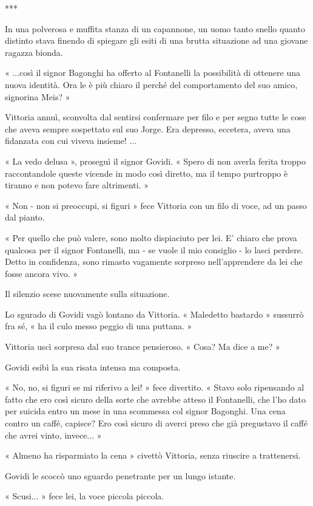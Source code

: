***

In una polverosa e muffita stanza di un capannone, un uomo tanto snello quanto distinto stava finendo di spiegare gli esiti di una brutta situazione ad una giovane ragazza bionda.

« ...così il signor Bagonghi ha offerto al Fontanelli la possibilità di ottenere una nuova identità. Ora le è più chiaro il perché del comportamento del suo amico, signorina Meis? »

Vittoria annuì, sconvolta dal sentirsi confermare per filo e per segno tutte le cose che aveva sempre sospettato sul suo Jorge. Era depresso, eccetera, aveva una fidanzata con cui viveva insieme! ...

« La vedo delusa », proseguì il signor Govidi. « Spero di non averla ferita troppo raccontandole queste vicende in modo così diretto, ma il tempo purtroppo è tiranno e non potevo fare altrimenti. »

« Non - non si preoccupi, si figuri » fece Vittoria con un filo di voce, ad un passo dal pianto.

« Per quello che può valere, sono molto dispiaciuto per lei. E' chiaro che prova qualcosa per il signor Fontanelli, ma - se vuole il mio consiglio - lo lasci perdere. Detto in confidenza, sono rimasto vagamente sorpreso nell'apprendere da lei che fosse ancora vivo. »

Il silenzio scese nuovamente sulla situazione.

Lo sgurado di Govidi vagò lontano da Vittoria. « Maledetto bastardo » sussurrò fra sé, « ha il culo messo peggio di una puttana. » 

Vittoria uscì sorpresa dal suo trance pensieroso. « Cosa? Ma dice a me?  »

Govidi esibì la sua risata intensa ma composta. 

« No, no, si figuri se mi riferivo a lei! » fece divertito.  « Stavo solo ripensando al fatto che ero così sicuro della sorte che avrebbe atteso il Fontanelli, che l'ho dato per suicida entro un mese in una scommessa col signor Bagonghi. Una cena contro un caffé, capisce? Ero così sicuro di averci preso che già pregustavo il caffé che avrei vinto, invece... »

« Almeno ha risparmiato la cena » civettò Vittoria, senza riuscire a trattenersi.

Govidi le scoccò uno sguardo penetrante per un lungo istante. 

« Scusi... » fece lei, la voce piccola piccola.

